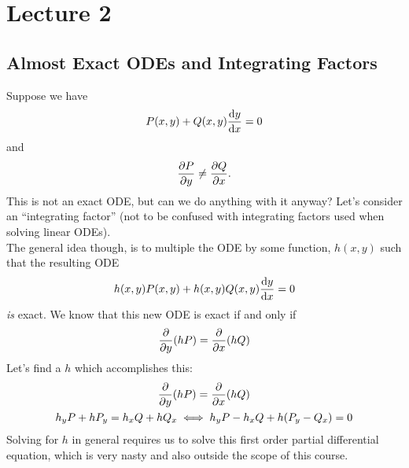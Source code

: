 \documentclass{report}
\begin{document}


\section{Lecture 2}
\subsection{Almost Exact ODEs and Integrating Factors}
Suppose we have
$$
  P(x,y) + Q(x,y)\frac{\mathrm{d} y}{\mathrm{d} x} = 0
$$
and
$$
  \frac{\partial P}{\partial y} \neq \frac{\partial Q}{\partial x}.
$$
This is not an exact ODE, but can we do anything with it anyway? Let's consider an ``integrating factor'' (not to be confused with integrating factors used when solving linear ODEs). \\

The general idea though, is to multiple the ODE by some function, $h(x,y)$ such that the resulting ODE
$$
  h(x,y)P(x,y) + h(x,y)Q(x,y)\frac{\mathrm{d} y}{\mathrm{d} x} = 0
$$
\textit{is} exact. We know that this new ODE is exact if and only if 
$$
  \frac{\partial }{\partial y}(hP) = \frac{\partial }{\partial x}(hQ)
$$
Let's find a $h$ which accomplishes this:
\begin{gather*}
  \frac{\partial }{\partial y}(hP) = \frac{\partial }{\partial x}(hQ) \\
  h_yP + hP_y = h_xQ + hQ_x \iff h_yP - h_xQ + h(P_y - Q_x) = 0 
\end{gather*}
Solving for $h$ in general requires us to solve this first order partial differential equation, which is very nasty and also outside the scope of this course. \\
\end{document}
